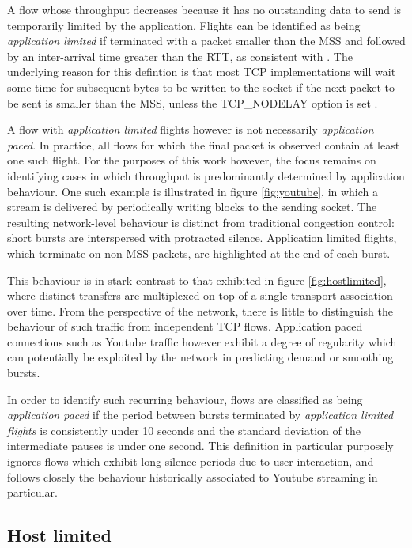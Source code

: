 A flow whose throughput decreases because it has no outstanding data to send is temporarily limited by the application. 
Flights can be identified as being \emph{application limited} if terminated with a packet smaller than the \ac{MSS} and followed by an inter-arrival time greater than the \ac{RTT}, as consistent with \cite{Zhang:2002p85}. 
The underlying reason for this defintion is that most \ac{TCP} implementations will wait some time for subsequent bytes to be written to the socket if the next packet to be sent is smaller than the \ac{MSS}, unless the \ac{TCP}\_NODELAY option is set \cite{Nagle:1984p458}.

A flow with \emph{application limited} flights however is not necessarily \emph{application paced}. 
In practice, all flows for which the final packet is observed contain at least one such flight.
For the purposes of this work however, the focus remains on identifying cases in which throughput is predominantly determined by application behaviour.
One such example is illustrated in figure \ref{fig:youtube}, in which a stream is delivered by periodically writing blocks to the sending socket.
The resulting network-level behaviour is distinct from traditional congestion control: short bursts are interspersed with protracted silence.
Application limited flights, which terminate on non-\ac{MSS} packets, are highlighted at the end of each burst.

This behaviour is in stark contrast to that exhibited in figure \ref{fig:hostlimited}, where distinct transfers are multiplexed on top of a single transport association over time.
From the perspective of the network, there is little to distinguish the behaviour of such traffic from independent \ac{TCP} flows.
Application paced connections such as Youtube traffic however exhibit a degree of regularity which can potentially be exploited by the network in predicting demand or smoothing bursts.

In order to identify such recurring behaviour, flows are classified as being \emph{application paced} if the period between bursts terminated by \emph{application limited flights} is consistently under 10 seconds and the standard deviation of the intermediate pauses is under one second.
This definition in particular purposely ignores flows which exhibit long silence periods due to user interaction, and follows closely the behaviour historically associated to Youtube streaming in particular.

\subsection{Host limited}
\label{section:rate:host}

